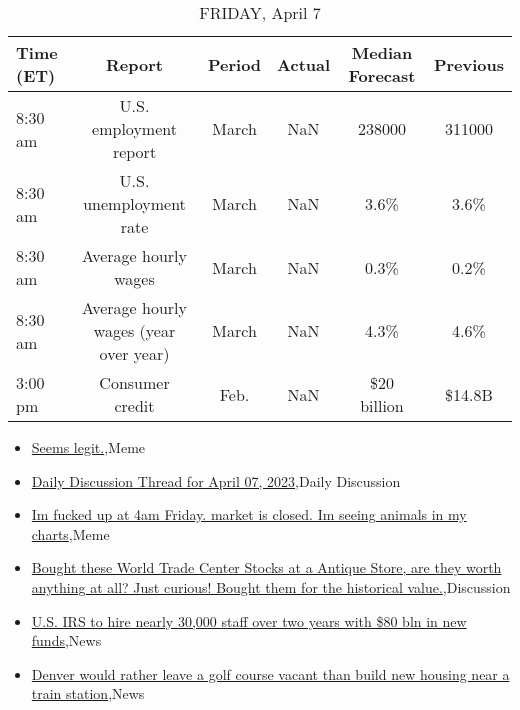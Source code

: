 \documentclass{article}%
\begin{document}
\begin{table}[htbp]%
\caption{FRIDAY, April 7}%
\centering%
\begin{adjustbox}{width=1\textwidth}%
\begin{tabular}{lccccc}
\toprule
Time (ET) &                                Report & Period & Actual & Median Forecast & Previous \\
\midrule
  8:30 am &                U.S. employment report &  March &    NaN &          238000 &   311000 \\
  8:30 am &                U.S. unemployment rate &  March &    NaN &            3.6\% &     3.6\% \\
  8:30 am &                  Average hourly wages &  March &    NaN &            0.3\% &     0.2\% \\
  8:30 am & Average hourly wages (year over year) &  March &    NaN &            4.3\% &     4.6\% \\
  3:00 pm &                       Consumer credit &   Feb. &    NaN &     \$20 billion &   \$14.8B \\
\bottomrule
\end{tabular}
%
\end{adjustbox}%
\end{table}

%
\begin{itemize}%
\item%
\href{https://reddit.com/r/wallstreetbets/comments/12ehrqq/seems\_legit/}{Seems legit.},Meme%
\item%
\href{https://reddit.com/r/wallstreetbets/comments/12efyze/daily\_discussion\_thread\_for\_april\_07\_2023/}{Daily Discussion Thread for April 07, 2023},Daily Discussion%
\item%
\href{https://reddit.com/r/wallstreetbets/comments/12efu3s/im\_fucked\_up\_at\_4am\_friday\_market\_is\_closed\_im/}{Im fucked up at 4am Friday. market is closed. Im seeing animals in my charts},Meme%
\item%
\href{https://reddit.com/r/StockMarket/comments/12e8bl7/bought\_these\_world\_trade\_center\_stocks\_at\_a/}{Bought these World Trade Center Stocks at a Antique Store, are they worth anything at all? Just curious! Bought them for the historical value.},Discussion%
\item%
\href{https://reddit.com/r/Economics/comments/12ehqcw/us\_irs\_to\_hire\_nearly\_30000\_staff\_over\_two\_years/}{U.S. IRS to hire nearly 30,000 staff over two years with \$80 bln in new funds},News%
\item%
\href{https://reddit.com/r/Economics/comments/12e2wh6/denver\_would\_rather\_leave\_a\_golf\_course\_vacant/}{Denver would rather leave a golf course vacant than build new housing near a train station},News%
\end{itemize}%
\end{document}
